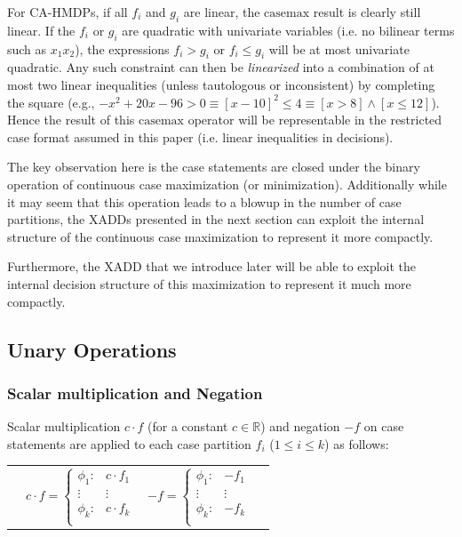 \documentclass[twoside,11pt]{article}
\newcommand{\casemax}{\mathrm{casemax}}
\begin{document}
For CA-HMDPs, if all $f_i$ and $g_i$ are linear, the $\casemax$ result is clearly still linear. If the $f_i$ or $g_i$ are quadratic with univariate variables (i.e. no bilinear terms such as $x_1x_2$), the expressions $f_i > g_i$ or $f_i \leq
g_i$ will be at most univariate quadratic. Any such constraint
can then be \emph{linearized} into a combination of at most 
two linear inequalities (unless tautologous or inconsistent) 
by completing the square (e.g., 
$-x^2 + 20x - 96 > 0 \equiv [x - 10]^2 \leq 4 \equiv [x > 8] \land [x \leq 12]$).  Hence
the result of this $\casemax$
operator will be representable in the restricted case format assumed in this paper
(i.e. linear inequalities in decisions). 

The key observation here is the case statements are closed under the binary operation of continuous case maximization (or minimization). Additionally while it may seem that this operation leads to a blowup in the number of case partitions, the XADDs presented in the next section can exploit the internal structure of the continuous case maximization to represent it more compactly. 

Furthermore, the 
XADD that we introduce later will be able to exploit the 
internal decision structure of this
maximization to represent it much more compactly.
\subsection{Unary Operations}

\subsubsection{Scalar multiplication and Negation}
Scalar multiplication $c\cdot f$ (for
a constant $c \in \mathbb{R}$) and negation $-f$ on case statements are applied to each case partition
$f_i$ ($1 \leq i \leq k$) as follows:
{%
\begin{center}
\begin{tabular}{r c c l}
&
  $c \cdot f = \begin{cases}
    \phi_1  : & c \cdot f_1 \\ 
   \vdots&\vdots\\ 
    \phi_k : & c \cdot f_k \\ 
  \end{cases}$
 &
\hspace{10mm}
  $-f = \begin{cases}
    \phi_1 : & - f_1 \\ 
   \vdots&\vdots\\ 
    \phi_k : & - f_k \\ 
  \end{cases}$
\end{tabular}
\end{center}
}
\end{document}
